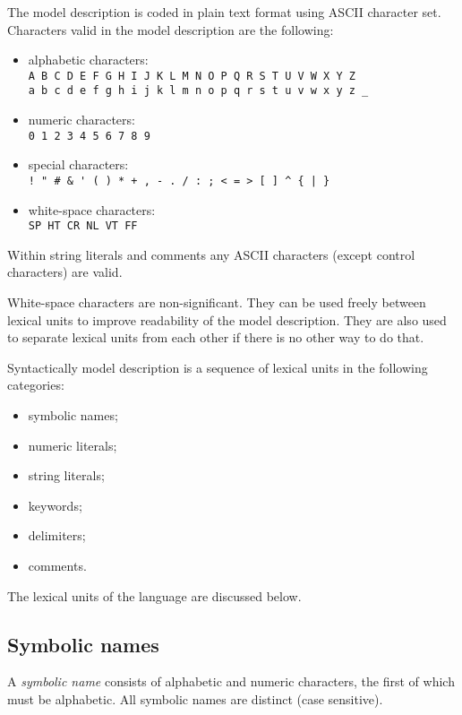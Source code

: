 \documentclass[10pt]{article}
\begin{document}
The model description is coded in plain text format using ASCII
character set. Characters valid in the model description are the
following:

\begin{itemize}
\item alphabetic characters:\\
\verb|A B C D E F G H I J K L M N O P Q R S T U V W X Y Z|\\
\verb|a b c d e f g h i j k l m n o p q r s t u v w x y z _|
\item numeric characters:\\
\verb|0 1 2 3 4 5 6 7 8 9|
\item special characters:\\
\verb?! " # & ' ( ) * + , - . / : ; < = > [ ] ^ { | }?
\item white-space characters:\\
\verb|SP HT CR NL VT FF|
\end{itemize}

Within string literals and comments any ASCII characters (except
control characters) are valid.

White-space characters are non-significant. They can be used freely
between lexical units to improve readability of the model description.
They are also used to separate lexical units from each other if there
is no other way to do that.

Syntactically model description is a sequence of lexical units in the
following categories:

\begin{itemize}
\item symbolic names;
\item numeric literals;
\item string literals;
\item keywords;
\item delimiters;
\item comments.
\end{itemize}

The lexical units of the language are discussed below.

\subsection{Symbolic names}

A {\it symbolic name} consists of alphabetic and numeric characters,
the first of which must be alphabetic. All symbolic names are distinct
(case sensitive).
\end{document}
